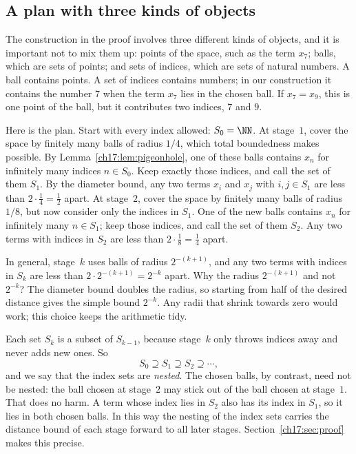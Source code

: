 \subsection*{A plan with three kinds of objects}
The construction in the proof involves three different kinds of objects, and it is important not to mix them up: points of the space, such as the term $x_7$; balls, which are sets of points; and sets of indices, which are sets of natural numbers. A ball contains points. A set of indices contains numbers; in our construction it contains the number $7$ when the term $x_7$ lies in the chosen ball. If $x_7=x_9$, this is one point of the ball, but it contributes two indices, $7$ and $9$.

Here is the plan. Start with every index allowed: $S_0=\NN$. At stage~$1$, cover the space by finitely many balls of radius $1/4$, which total boundedness makes possible. By Lemma~\ref{ch17:lem:pigeonhole}, one of these balls contains $x_n$ for infinitely many indices $n\in S_0$. Keep exactly those indices, and call the set of them $S_1$. By the diameter bound, any two terms $x_i$ and $x_j$ with $i,j\in S_1$ are less than $2\cdot\tfrac14=\tfrac12$ apart. At stage~$2$, cover the space by finitely many balls of radius $1/8$, but now consider only the indices in $S_1$. One of the new balls contains $x_n$ for infinitely many $n\in S_1$; keep those indices, and call the set of them $S_2$. Any two terms with indices in $S_2$ are less than $2\cdot\tfrac18=\tfrac14$ apart.

In general, stage~$k$ uses balls of radius $2^{-(k+1)}$, and any two terms with indices in $S_k$ are less than $2\cdot2^{-(k+1)}=2^{-k}$ apart. Why the radius $2^{-(k+1)}$ and not $2^{-k}$? The diameter bound doubles the radius, so starting from half of the desired distance gives the simple bound $2^{-k}$. Any radii that shrink towards zero would work; this choice keeps the arithmetic tidy.

Each set $S_k$ is a subset of $S_{k-1}$, because stage~$k$ only throws indices away and never adds new ones. So
\[
 S_0\supseteq S_1\supseteq S_2\supseteq\cdots,
\]
and we say that the index sets are \emph{nested}. The chosen balls, by contrast, need not be nested: the ball chosen at stage~$2$ may stick out of the ball chosen at stage~$1$. That does no harm. A term whose index lies in $S_2$ also has its index in $S_1$, so it lies in both chosen balls. In this way the nesting of the index sets carries the distance bound of each stage forward to all later stages. Section~\ref{ch17:sec:proof} makes this precise.
